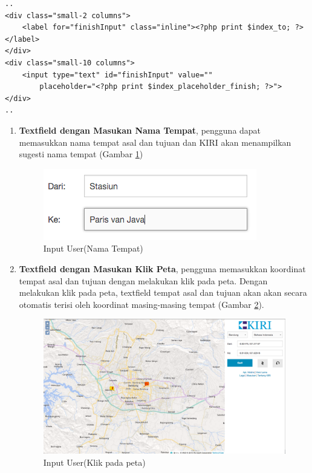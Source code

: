 \begin{lstlisting}[caption=Menampilkan \textit{textfield} tempat tujuan kepada pengguna ,label = {lst_3_php_textfield_to}]
..
<div class="small-2 columns">
	<label for="finishInput" class="inline"><?php print $index_to; ?></label>
</div>
<div class="small-10 columns">
	<input type="text" id="finishInput" value=""
		placeholder="<?php print $index_placeholder_finish; ?>">
</div>
..
\end{lstlisting}

\begin{enumerate}
	\item \textbf{Textfield dengan Masukan Nama Tempat}, pengguna dapat memasukkan nama tempat asal dan tujuan dan KIRI akan menampilkan sugesti nama tempat (Gambar \ref{fig:3_KIRI_textfield_nama})
	
	\begin{figure}[H]
		\centering
		\includegraphics[scale=0.5]{Gambar/KIRI-textfield-nama}
		\caption{Input User(Nama Tempat)} 
		\label{fig:3_KIRI_textfield_nama}
	\end{figure}
	
	\item \textbf{Textfield dengan Masukan Klik Peta}, pengguna memasukkan koordinat tempat asal dan tujuan dengan melakukan klik pada peta. Dengan melakukan klik pada peta, textfield tempat asal dan tujuan akan akan secara otomatis terisi oleh koordinat masing-masing tempat (Gambar \ref{fig:3_KIRI_textfield_koord}).
	
\begin{figure}[H]
	\centering
	\includegraphics[scale=0.3]{Gambar/KIRI-textfield-koord}
	\caption{Input User(Klik pada peta)} 
	\label{fig:3_KIRI_textfield_koord}
\end{figure}
	

\end{enumerate}
